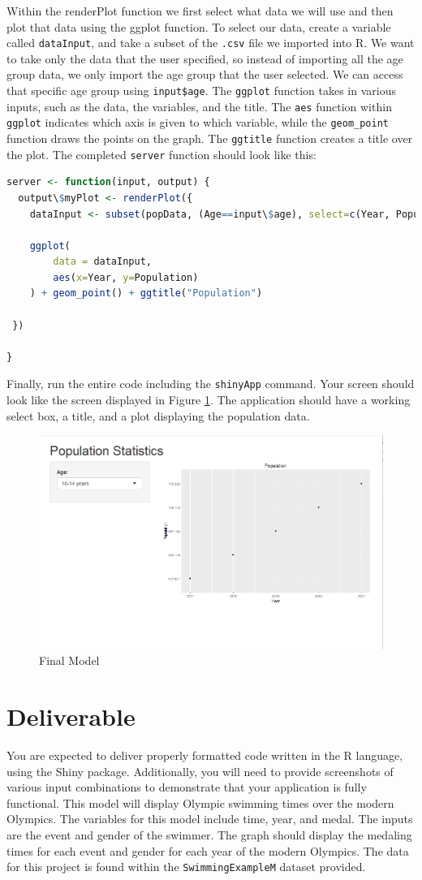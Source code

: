 Within the renderPlot function we first select what data we will use and then plot that data using the ggplot function.
To select our data, create a variable called \texttt{dataInput}, and take a subset of the \texttt{.csv} file we imported into R.
We want to take only the data that the user specified, so instead of importing all the age group data, we only import the age group that the user selected.
We can access that specific age group using \texttt{input\$age}.
The \texttt{ggplot} function takes in various inputs, such as the data, the variables, and the title.
The \texttt{aes} function within \texttt{ggplot} indicates which axis is given to which variable, while the \texttt{geom\_point} function draws the points on the graph.
The \texttt{ggtitle} function creates a title over the plot.
The completed \texttt{server} function should look like this: 
\begin{lstlisting}[language = R]
server <- function(input, output) {
  output\$myPlot <- renderPlot({
    dataInput <- subset(popData, (Age==input\$age), select=c(Year, Population, State))
    
    ggplot(
        data = dataInput, 
        aes(x=Year, y=Population)
    ) + geom_point() + ggtitle("Population")
    
 })
  
}
\end{lstlisting}
Finally, run the entire code including the \texttt{shinyApp} command.
Your screen should look like the screen displayed in Figure \ref{fig:example}.
The application should have a working select box, a title, and a plot displaying the population data.
\begin{figure}[h]
   \centering
   \includegraphics[width = .5\textwidth]{pictures/shiny/pop.PNG} 
   \caption{Final Model}
   \label{fig:example}
\end{figure}

\section{Deliverable}

You are expected to deliver properly formatted code written in the R language, using the Shiny package.
Additionally, you will need to provide screenshots of various input combinations to demonstrate that your application is fully functional.
This model will display Olympic swimming times over the modern Olympics.
The variables for this model include time, year, and medal.
The inputs are the event and gender of the swimmer.
The graph should display the medaling times for each event and gender for each year of the modern Olympics.
The data for this project is found within the \texttt{SwimmingExampleM} dataset provided. 
